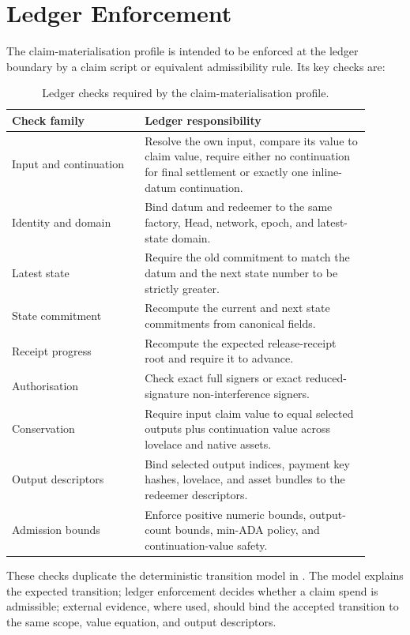 \documentclass[a4paper,11pt]{article}
\theoremstyle{definition}
\theoremstyle{plain}
\theoremstyle{remark}
\begin{document}
\section{Ledger Enforcement}
\label{sec:enforcement}

The claim-materialisation profile is intended to be enforced at the ledger
boundary by a claim script or equivalent admissibility rule. Its key checks are:

\begin{longtable}{L{0.33\linewidth}L{0.57\linewidth}}
\caption{Ledger checks required by the claim-materialisation profile.}
\\
\toprule
\textbf{Check family} & \textbf{Ledger responsibility}\\
\midrule
\endhead
Input and continuation & Resolve the own input, compare its value to claim
value, require either no continuation for final settlement or exactly one
inline-datum continuation.\\
Identity and domain & Bind datum and redeemer to the same factory, Head,
network, epoch, and latest-state domain.\\
Latest state & Require the old commitment to match the datum and the next state
number to be strictly greater.\\
State commitment & Recompute the current and next state commitments from
canonical fields.\\
Receipt progress & Recompute the expected release-receipt root and require it
to advance.\\
Authorisation & Check exact full signers or exact reduced-signature
non-interference signers.\\
Conservation & Require input claim value to equal selected outputs plus
continuation value across lovelace and native assets.\\
Output descriptors & Bind selected output indices, payment key hashes,
lovelace, and asset bundles to the redeemer descriptors.\\
Admission bounds & Enforce positive numeric bounds, output-count bounds,
min-ADA policy, and continuation-value safety.\\
\bottomrule
\end{longtable}

These checks duplicate the deterministic transition model in
. The model explains the expected transition; ledger
enforcement decides whether a claim spend is admissible; external evidence,
where used, should bind the accepted transition to the same scope, value
equation, and output descriptors.
\end{document}
